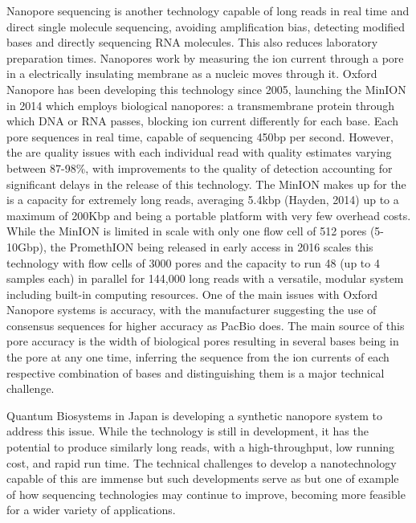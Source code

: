 Nanopore sequencing is another technology capable of long reads in real time and direct single molecule sequencing, avoiding amplification bias, detecting modified bases and directly sequencing RNA molecules. This also reduces laboratory preparation times. Nanopores work by measuring the ion current through a pore in a electrically insulating membrane as a nucleic moves through it. Oxford Nanopore has been developing this technology since 2005, launching the MinION in 2014 which employs biological nanopores: a transmembrane protein through which DNA or RNA passes, blocking ion current differently for each base. Each pore sequences in real time, capable of sequencing 450bp per second. However, the are quality issues with each individual read with quality estimates varying between 87-98\%, with improvements to the quality of detection accounting for significant delays in the release of this technology. The MinION makes up for the is a capacity for extremely long reads, averaging 5.4kbp (Hayden, 2014) up to a maximum of 200Kbp and being a portable platform with very few overhead costs. While the MinION is limited in scale with only one flow cell of 512 pores (5-10Gbp), the PromethION being released in early access in 2016 scales this technology with flow cells of 3000 pores and the capacity to run 48 (up to 4 samples each) in parallel for 144,000 long reads with a versatile, modular system including built-in computing resources. One of the main issues with Oxford Nanopore systems is accuracy, with the manufacturer suggesting the use of consensus sequences for higher accuracy as PacBio does. The main source of this pore accuracy is the width of biological pores resulting in several bases being in the pore at any one time, inferring the sequence from the ion currents of each respective combination of bases and distinguishing them is a major technical challenge.

Quantum Biosystems in Japan is developing a synthetic nanopore system to address this issue. While the technology is still in development, it has the potential to produce similarly long reads, with a high-throughput, low running cost, and rapid run time. The technical challenges to develop a nanotechnology capable of this are immense but such developments serve as but one of example of how sequencing technologies may continue to improve, becoming more feasible for a wider variety of applications.


